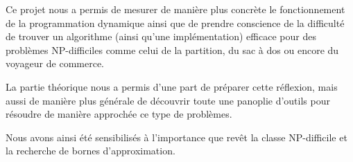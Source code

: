 \documentclass[a4paper, 12pt]{article}
\begin{document}
Ce projet nous a permis de mesurer de manière plus concrète le
fonctionnement de la programmation dynamique ainsi que de prendre
conscience de la difficulté de trouver un algorithme (ainsi qu'une
implémentation) efficace pour des problèmes NP-difficiles comme celui
de la partition, du sac à dos ou encore du voyageur de commerce.

La partie théorique nous a permis d'une part de préparer cette
réflexion, mais aussi de manière plus générale de découvrir toute une
panoplie d'outils pour résoudre de manière approchée ce type de
problèmes.

Nous avons ainsi été sensibilisés à l'importance que revêt la classe
NP-difficile et la recherche de bornes d'approximation.

\end{document}
